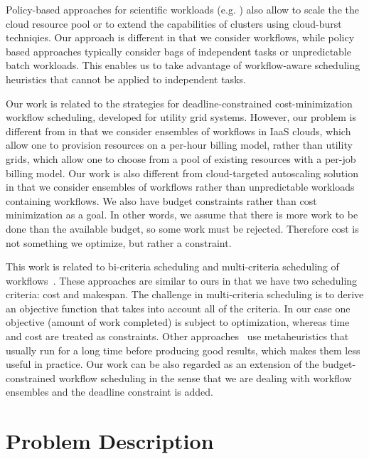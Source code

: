 \documentclass{sig-alternate}
\begin{document}
Policy-based approaches for scientific workloads (e.g. \cite{Marshall2010,
Kim2011}) also allow to scale the the cloud resource pool or to extend the
capabilities of clusters using cloud-burst techniqies. Our approach is different
in that we consider workflows, while policy based approaches typically consider
bags of independent tasks or unpredictable batch workloads. This enables us to
take advantage of workflow-aware scheduling heuristics that cannot be applied to
independent tasks.


Our work is related to the strategies for deadline-constrained cost-minimization
workflow scheduling, developed for utility grid systems. However, our problem is
different from \cite{Yu2005, Abrishami2010} in that we consider ensembles of workflows in
IaaS clouds, which allow one to provision resources on a per-hour billing model,
rather than utility grids, which allow one to choose from a pool of existing
resources with a per-job billing model. Our work is also different from
cloud-targeted autoscaling solution~\cite{Mao2011} in that we consider ensembles
of workflows rather than unpredictable workloads containing workflows. We also have budget constraints
rather than cost minimization as a goal. In other words, we assume that there is
more work to be done than the available budget, so some work must be rejected.
Therefore cost is not something we optimize, but rather a constraint.


This work is related to bi-criteria scheduling and multi-criteria scheduling of
workflows~\cite{Wieczorek2009,Prodan10,Dongarra2007}. These approaches are
similar to ours in that we have two scheduling criteria: cost and makespan. The
challenge in multi-criteria scheduling is to derive an objective function that
takes into account all of the criteria. In our case one objective (amount
of work completed) is subject to optimization, whereas time and cost are
treated as constraints. Other approaches~\cite{Talukder2009,Pandey2010} use
metaheuristics that usually run for a long time before producing good results,
which makes them less useful in practice. Our work can be also
regarded as an extension of the budget-constrained workflow scheduling
\cite{Sakellariou2007} in the sense that we are dealing with workflow ensembles
and the deadline constraint is added.
 
\section{Problem Description}
\label{sec:problem}
\end{document}
